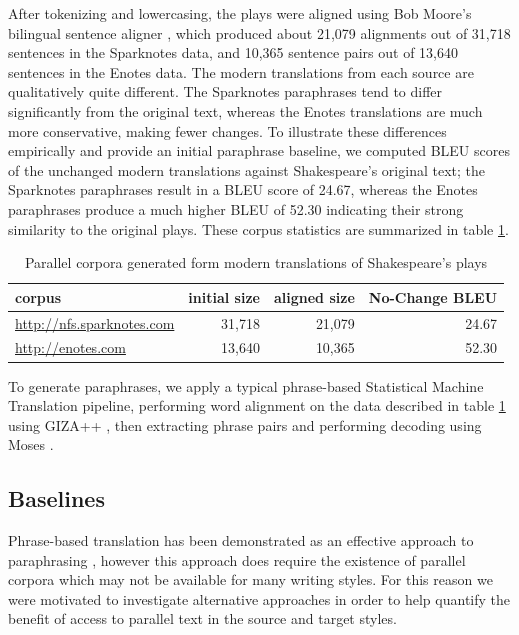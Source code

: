 \documentclass[10pt,a5paper,twoside]{article}
\begin{document}
After tokenizing and lowercasing, the plays were aligned using Bob Moore's bilingual sentence aligner \cite{Moore02}, which produced about 21,079 alignments out of 31,718 sentences in the Sparknotes data, and 10,365 sentence pairs out of 13,640 sentences in the Enotes data.  The modern translations from each source are qualitatively quite
different.  The Sparknotes paraphrases tend to differ significantly from the original text, whereas the Enotes translations are much more conservative, making fewer changes.
To illustrate these differences empirically and provide an initial paraphrase baseline, we computed BLEU scores of the unchanged modern translations against Shakespeare's 
original text; the Sparknotes paraphrases result in a BLEU score of 24.67, whereas the Enotes paraphrases produce a much higher BLEU of 52.30 indicating their strong similarity to the original plays.
These corpus statistics are summarized in table \ref{corpus_stats}.

\begin{table}
  \begin{center}
    \begin{tabular}{|l|r|r|r|}
      \hline
      corpus & initial size & aligned size & No-Change BLEU\\
      \hline
      \hline
      \url{http://nfs.sparknotes.com} & 31,718 & 21,079 & 24.67 \\
      \hline
      \url{http://enotes.com} & 13,640 & 10,365 & 52.30 \\
      \hline
    \end{tabular}
  \end{center}
  \caption{Parallel corpora generated form modern translations of Shakespeare's plays}
  \label{corpus_stats}
\end{table}

To generate paraphrases, we apply a typical phrase-based Statistical Machine Translation pipeline, performing
word alignment on the data described in table \ref{corpus_stats} using GIZA++ \cite{Och03}, then extracting phrase pairs and performing decoding using Moses \cite{Koehn07}.

\subsection{Baselines}
Phrase-based translation has been demonstrated as an effective approach to paraphrasing \cite{quirk04,chen11}, however this approach does require the existence of
parallel corpora which may not be available for many writing styles.  For this reason we were motivated to investigate alternative approaches in order to help
quantify the benefit of access to parallel text in the source and target styles.
\end{document}
